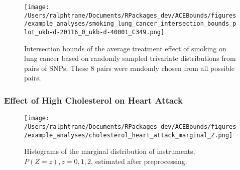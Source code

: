 \documentclass[
]{article}
\theoremstyle{plain}
\begin{document}
\clearpage

\begin{figure}[H]
  \center
  \texttt{[image: /Users/ralphtrane/Documents/RPackages\_dev/ACEBounds/figures/example\_analyses/smoking\_lung\_cancer\_intersection\_bounds\_plot\_ukb-d-20116\_0\_ukb-d-40001\_C349.png]}
  \caption{Intersection bounds of the average treatment effect of smoking on lung cancer based on randomly sampled trivariate distributions from pairs of SNPs. These 8 pairs were randomly chosen from all possible pairs.}
  \label{fig:smoking_on_lung_cancer_intersections}
\end{figure}

\hypertarget{effect-of-high-cholesterol-on-heart-attack}{%
\subsubsection{\texorpdfstring{Effect of High Cholesterol on Heart Attack \label{appendix:cholesterol-on-heart-attack}}{Effect of High Cholesterol on Heart Attack }}\label{effect-of-high-cholesterol-on-heart-attack}}

\begin{figure}[H]
  \center
  \texttt{[image: /Users/ralphtrane/Documents/RPackages\_dev/ACEBounds/figures/example\_analyses/cholesterol\_heart\_attack\_marginal\_Z.png]}
  \caption{Histograms of the marginal distribution of instruments, $P(Z = z), z=0,1,2$, estimated after preprocessing.}
  \label{fig:marginal-distribution-of-instruments-cholesterol-heart-attack}
\end{figure}
\end{document}
